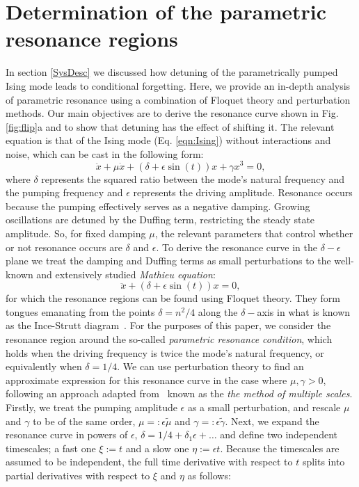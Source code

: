 \section{Determination of the parametric resonance regions}\label{Appendix:PR}
In section \ref{SysDesc} we discussed how detuning of the parametrically pumped Ising mode leads to conditional forgetting. Here, we provide an in-depth analysis of parametric resonance using a combination of Floquet theory and perturbation methods. Our main objectives are to derive the resonance curve shown in Fig. \ref{fig:flip}a and to show that detuning has the effect of shifting it. The relevant equation is that of the Ising mode (Eq. \ref{eqn:Ising}) without interactions and noise, which can be cast in the following form:
\begin{equation}
\ddot{x} + \mu\dot{x} + \left(\delta + \epsilon\sin(t)\right)x + \gamma x^3 = 0,\label{eqn:math_PO}
\end{equation}
where $\delta$ represents the squared ratio between the mode's natural frequency and the pumping frequency and $\epsilon$ represents the driving amplitude. Resonance occurs because the pumping effectively serves as a negative damping. Growing oscillations are detuned by the Duffing term, restricting the steady state amplitude. So, for fixed damping $\mu$, the relevant parameters that control whether or not resonance occurs are $\delta$ and $\epsilon$. To derive the resonance curve in the $\delta-\epsilon$ plane we treat the damping and Duffing terms as small perturbations to the well-known and extensively studied \emph{Mathieu equation}:
\begin{equation}
    \ddot{x} + \left(\delta + \epsilon\sin(t)\right)x  = 0,
\end{equation}
for which the resonance regions can be found using Floquet theory. They form tongues emanating from the points $\delta = n^2/4$ along the $\delta-$axis in what is known as the Ince-Strutt diagram~\cite{Mathieu_eq}. For the purposes of this paper, we consider the resonance region around the so-called \emph{parametric resonance condition}, which holds when the driving frequency is twice the mode's natural frequency, or equivalently when $\delta = 1/4$. We can use perturbation theory to find an approximate expression for this resonance curve in the case where $\mu, \gamma > 0$, following an approach adapted from~\cite{Mathieu_eq} known as the \emph{the method of multiple scales}. Firstly, we treat the pumping amplitude $\epsilon$ as a small perturbation, and rescale $\mu$ and $\gamma$ to be of the same order, $\mu =: \epsilon \tilde{\mu}$ and $\gamma =: \epsilon \tilde{\gamma}$. Next, we expand the resonance curve in powers of $\epsilon$, $\delta = 1/4 + \delta_1\epsilon + \dots$ and define two independent timescales; a fast one $\xi := t$ and a slow one $\eta := \epsilon t$. Because the timescales are assumed to be independent, the full time derivative with respect to $t$ splits into partial derivatives with respect to $\xi$ and $\eta$ as follows:
